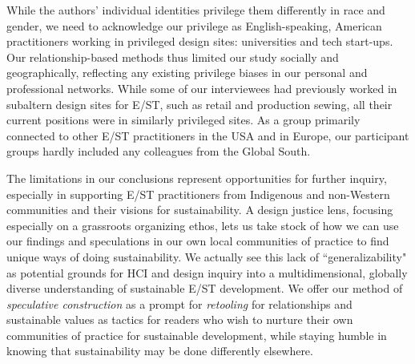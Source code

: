 \documentclass[manuscript,review,anonymous]{acmart}
\begin{document}
While the authors' individual identities privilege them differently in race and gender, we need to acknowledge our privilege as English-speaking, American practitioners working in privileged design sites: universities and tech start-ups. 
Our relationship-based methods thus limited our study socially and geographically, reflecting any existing privilege biases in our personal and professional networks. While some of our interviewees had previously worked in subaltern design sites for E/ST, such as retail and production sewing, all their current positions were in similarly privileged sites. As a group primarily connected to other E/ST practitioners in the USA and in Europe, our participant groups hardly included any colleagues from the Global South. 

The limitations in our conclusions represent opportunities for further inquiry, especially in supporting E/ST practitioners from Indigenous and non-Western communities and their visions for sustainability. A design justice lens, focusing especially on a grassroots organizing ethos, lets us take stock of how we can use our findings and speculations in our own local communities of practice to find unique ways of doing sustainability. We actually see this lack of ``generalizability" as potential grounds for HCI and design inquiry into a multidimensional, globally diverse understanding of sustainable E/ST development. 
We offer our method of \textit{speculative construction} as a prompt for \textit{retooling} for relationships and sustainable values as tactics for readers who wish to nurture their own communities of practice for sustainable development,  while staying humble in knowing that sustainability may be done differently elsewhere.
\end{document}
